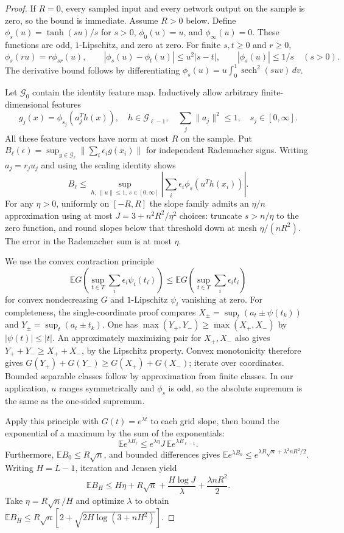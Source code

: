 \begin{proof}
If $R=0$, every sampled input and every network output on the sample is
zero, so the bound is immediate. Assume $R>0$ below.
Define $\phi_s(u)=\tanh(su)/s$ for $s>0$, $\phi_0(u)=u$, and
$\phi_\infty(u)=0$. These functions are odd, $1$-Lipschitz, and zero at zero.
For finite $s,t\ge0$ and $r\ge0$,
\[
 \phi_s(ru)=r\phi_{sr}(u),\qquad
 |\phi_s(u)-\phi_t(u)|\le u^2|s-t|,
 \qquad |\phi_s(u)|\le1/s\quad(s>0).
\]
The derivative bound follows by differentiating
$\phi_s(u)=u\int_0^1\operatorname{sech}^2(suv)\,dv$.

Let $\mathcal G_0$ contain the identity feature map. Inductively allow
arbitrary finite-dimensional features
\[
 g_j(x)=\phi_{s_j}(a_j^T h(x)),\quad
 h\in\mathcal G_{\ell-1},\quad \sum_j\|a_j\|^2\le1,
 \quad s_j\in[0,\infty].
\]
All these feature vectors have norm at most $R$ on the sample. Put
$B_\ell(\epsilon)=\sup_{g\in\mathcal G_\ell}
 \|\sum_i\epsilon_i g(x_i)\|$ for independent Rademacher signs.
Writing $a_j=r_j u_j$ and using the scaling identity shows
\[
 B_\ell\le
 \sup_{h,\,\|u\|\le1,\,s\in[0,\infty]}
 \left|\sum_i\epsilon_i\phi_s(u^T h(x_i))\right|.
\]
For any $\eta>0$, uniformly on $[-R,R]$ the slope family admits an
$\eta/n$ approximation using at most
$J=3+n^2R^2/\eta^2$ choices: truncate $s>n/\eta$ to the zero function,
and round slopes below that threshold down at mesh $\eta/(nR^2)$.
The error in the Rademacher sum is at most $\eta$.

We use the convex contraction principle
\[
 \mathbb E G\!\left(\sup_{t\in T}\sum_i\epsilon_i\psi_i(t_i)\right)
 \le
 \mathbb E G\!\left(\sup_{t\in T}\sum_i\epsilon_i t_i\right)
\]
for convex nondecreasing $G$ and $1$-Lipschitz $\psi_i$ vanishing at zero.
For completeness, the single-coordinate proof compares
$X_\pm=\sup_t(a_t\pm\psi(t_k))$ and
$Y_\pm=\sup_t(a_t\pm t_k)$. One has
$\max(Y_+,Y_-)\ge\max(X_+,X_-)$ by $|\psi(t)|\le|t|$.
An approximately maximizing pair for $X_+,X_-$ also gives
$Y_++Y_-\ge X_++X_-$, by the Lipschitz property.
Convex monotonicity therefore gives
$G(Y_+)+G(Y_-)\ge G(X_+)+G(X_-)$; iterate over coordinates.
Bounded separable classes follow by approximation from finite classes.
In our application, $u$ ranges symmetrically and $\phi_s$ is odd, so the
absolute supremum is the same as the one-sided supremum.

Apply this principle with $G(t)=e^{\lambda t}$ to each grid slope, then
bound the exponential of a maximum by the sum of the exponentials:
\[
 \mathbb E e^{\lambda B_\ell}
 \le e^{\lambda\eta}J\,\mathbb E e^{\lambda B_{\ell-1}}.
\]
Furthermore, $\mathbb E B_0\le R\sqrt n$, and bounded differences gives
$\mathbb E e^{\lambda B_0}
 \le e^{\lambda R\sqrt n+\lambda^2nR^2/2}$.
Writing $H=L-1$, iteration and Jensen yield
\[
 \mathbb E B_H\le H\eta+R\sqrt n+
             \frac{H\log J}{\lambda}+\frac{\lambda nR^2}{2}.
\]
Take $\eta=R\sqrt n/H$ and optimize $\lambda$ to obtain
$\mathbb E B_H\le R\sqrt n[2+\sqrt{2H\log(3+nH^2)}]$.


\end{proof}
